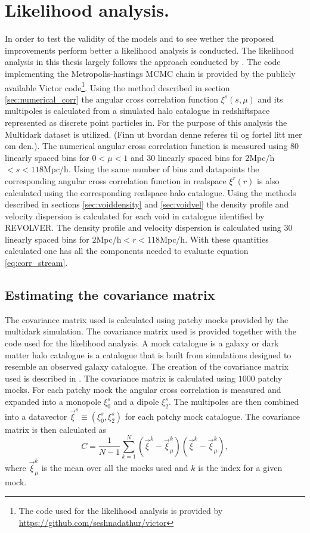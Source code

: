 \section{Likelihood analysis.}
In order to test the validity of the models and to see wether the proposed improvements perform better a likelihood analysis is conducted. The likelihood analysis in this thesis largely follows the approach conducted by \cite{BeyondBAO}. The code implementing the Metropolis-hastings MCMC chain is provided by the publicly available Victor code\footnote{The code used for the likelihood analysis is provided by \url{https://github.com/seshnadathur/victor}}. Using the method described in section \ref{sec:numerical_corr} the angular cross correlation function $\xi^s(s,\mu)$ and its multipoles is calculated from a simulated halo catalogue in redshiftspace represented as discrete point particles in. For the purpose of this analysis the Multidark dataset is utilized. (Finn ut hvordan denne referes til og fortel litt mer om den.). The numerical angular cross correlation function  is measured using $80$ linearly spaced bins for $0<\mu<1$ and $30$ linearly spaced bins for $2$Mpc/h$<s<118$Mpc/h. Using the same number of bins and datapoints the corresponding angular cross correlation function in realspace $\xi^r(r)$ is also calculated using the corresponding realspace halo catalogue. Using the methods described in sections \ref{sec:voiddensity} and \ref{sec:voidvel} the density profile and velocity dispersion is calculated for each void in catalogue identified by REVOLVER. The density profile and velocity dispersion is calculated using $30$ linearly spaced bins for $2$Mpc/h$<r<118$Mpc/h. With these quantities calculated one has all the components needed to evaluate equation \ref{eq:corr_stream}.
\subsection{Estimating the covariance matrix}
The covariance matrix used is calculated using patchy mocks provided by the multidark simulation\cite{MDmock1}\cite{MDmock2}. The covariance matrix used is provided together with the code used for the likelihood analysis. A mock catalogue is a galaxy or dark matter halo catalogue is a catalogue that is built from simulations designed to resemble an observed galaxy catalogue. The creation of the covariance matrix used is described in \cite{BeyondBAO}. The covariance matrix is calculated using $1000$ patchy mocks. For each patchy mock the angular cross correlation is measured and expanded into a monopole $\xi_0^s$ and a dipole $\xi_2^s$. The multipoles are then combined into a datavector $\vec{\xi}^s\equiv(\xi_0^s, \xi_2^s)$ for each patchy mock catalogue. The covariance matrix is then calculated as
\begin{equation}
    C=\frac{1}{N-1}\sum_{k=1}^N(\vec{\xi} ^k-\vec{\xi}^k_\mu)(\vec{\xi}^k-\vec{\xi}^k_\mu),
\end{equation} 
where $\vec{\xi}^k_\mu$ is the mean over all the mocks used and $k$ is the index for a given mock.
